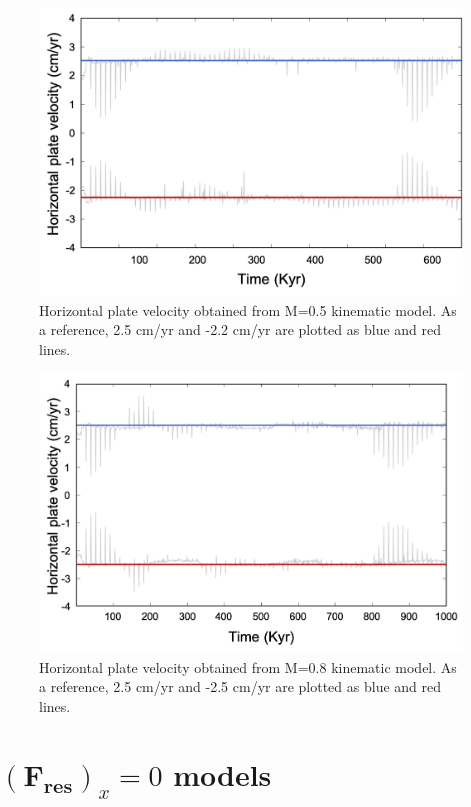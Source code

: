 \documentclass[letterpaper,12pt,notitle]{memphisthesis}                     %
\begin{document}
\begin{figure}[!htb]
	\centering
	\includegraphics[width=0.9\linewidth]{./figs/km05.png}
	\caption{Horizontal plate velocity obtained from M=0.5 kinematic model. As a reference, 2.5 cm/yr and -2.2 cm/yr are plotted as blue and red lines.}
	\label{fig:km05}
\end{figure}
\begin{figure}[!htb]
	\centering
	\includegraphics[width=0.9\linewidth]{./figs/km08.png}
	\caption{Horizontal plate velocity obtained from M=0.8 kinematic model. As a reference, 2.5 cm/yr and -2.5 cm/yr are plotted as blue and red lines.}
	\label{fig:km08}
\end{figure}



\section{$(\boldsymbol{F_{res}})_x=0$ models}
\end{document}
